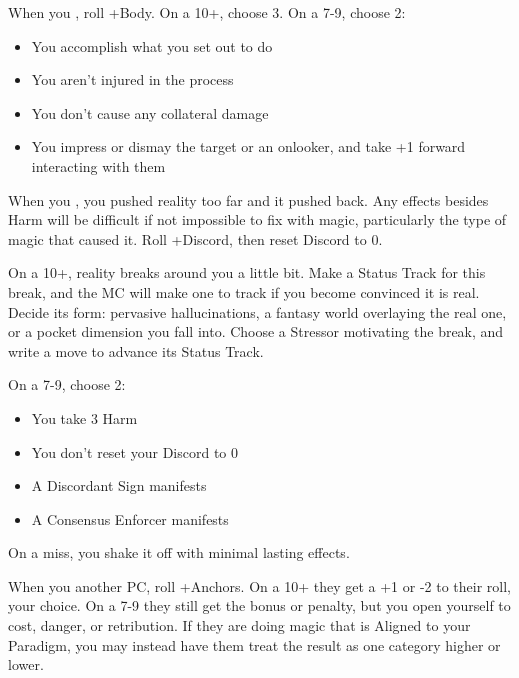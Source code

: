 \begin{multicols}{3}
  \columnbreak
  
  \begin{move}
    When you , roll +Body. On a 10+, choose 3. On a 7-9,
    choose 2:
    \begin{itemize}
      \setlength\itemsep{0em}
    \item You accomplish what you set out to do
    \item You aren't injured in the process
    \item You don't cause any collateral damage
    \item You impress or dismay the target or an onlooker, and take +1
      forward interacting with them
    \end{itemize}
  \end{move}

  \SEPARATOR

  \begin{move}
    When you , you pushed reality too far and it
    pushed back. Any effects besides Harm will be difficult if not
    impossible to fix with magic, particularly the type of magic that
    caused it. Roll +Discord, then reset Discord to 0.

    On a 10+, reality breaks around you a little bit. Make a Status
    Track for this break, and the MC will make one to track if you
    become convinced it is real. Decide its form: pervasive
    hallucinations, a fantasy world overlaying the real one, or a
    pocket dimension you fall into. Choose a Stressor motivating the
    break, and write a move to advance its Status Track.

    On a 7-9, choose 2:
    \begin{itemize}
      \setlength\itemsep{0em}
    \item You take 3 Harm
    \item You don't reset your Discord to 0
    \item A Discordant Sign manifests
    \item A Consensus Enforcer manifests
    \end{itemize}

    On a miss, you shake it off with minimal lasting effects.
  \end{move}

  \SEPARATOR

  \begin{move}
    When you  another PC, roll +Anchors. On a
    10+ they get a +1 or -2 to their roll, your choice. On a 7-9 they
    still get the bonus or penalty, but you open yourself to cost,
    danger, or retribution. If they are doing magic that is Aligned to
    your Paradigm, you may instead have them treat the result as one
    category higher or lower.
  \end{move}

\end{multicols}

